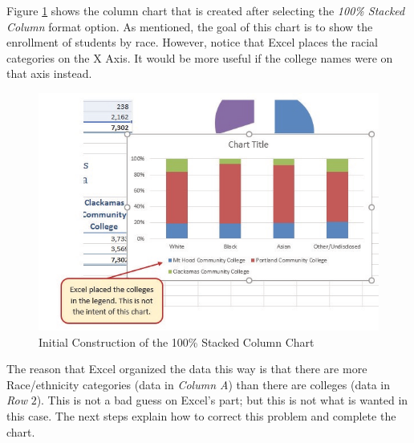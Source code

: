 Figure \ref{04:fig25} shows the column chart that is created after selecting the \textit{100\% Stacked Column} format option. As mentioned, the goal of this chart is to show the enrollment of students by race. However, notice that Excel places the racial categories on the X Axis. It would be more useful if the college names were on that axis instead.

\begin{figure}[H]
	\centering
	\includegraphics[width=\maxwidth{.95\linewidth}]{gfx/ch04_fig25}
	\caption{Initial Construction of the 100\% Stacked Column Chart}
	\label{04:fig25}
\end{figure}

The reason that Excel organized the data this way is that there are more Race/ethnicity categories (data in \textit{Column A}) than there are colleges (data in \textit{Row }$ 2 $). This is not a bad guess on Excel's part; but this is not what is wanted in this case. The next steps explain how to correct this problem and complete the chart.

